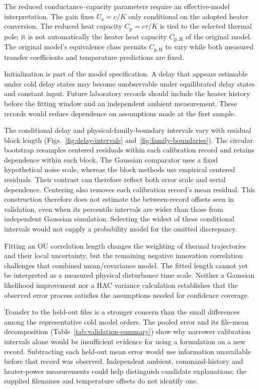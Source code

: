 \documentclass[11pt]{article}
\newcommand{\Ua}{U_{\mathrm a}}
\newcommand{\Cp}{C_{\mathrm p}}
\newcommand{\CpH}{C_{\mathrm{p,H}}}
\begin{document}
The reduced conductance--capacity parameters require an effective-model
interpretation. The gain fixes $\Ua=c/K$ only conditional on the adopted heater
conversion. The reduced heat capacity $\Cp=c\tau/K$ is tied to the selected
thermal pole; it is not automatically the heater heat capacity $\CpH$ of the
original model. The original model's equivalence class permits $\CpH$ to vary
while both measured transfer coefficients and temperature predictions are fixed.

Initialization is part of the model specification. A delay that appears estimable
under cold delay states may become unobservable under equilibrated delay states
and constant input. Future laboratory records should include the heater history
before the fitting window and an independent ambient measurement. These records
would reduce dependence on assumptions made at the first sample.

The conditional delay and physical-family-boundary intervals vary with residual
block length (Figs.~\ref{fig:delay-intervals} and~\ref{fig:family-boundaries}).
The circular bootstrap resamples centered residuals within each calibration
record and retains dependence within each block. The Gaussian comparator uses
a fixed hypothetical noise scale, whereas the block methods use empirical
centered residuals. Their contrast can therefore reflect both error scale and
serial dependence. Centering also
removes each calibration record's mean residual. This construction therefore
does not estimate the between-record offsets seen in validation, even when its
percentile intervals are wider than those from independent Gaussian simulation.
Selecting the widest of these conditional intervals would not supply a
probability model for the omitted discrepancy.

Fitting an OU correlation length
changes the weighting of thermal trajectories and their local uncertainty, but
the remaining negative innovation correlation challenges that combined
mean/covariance model. The fitted length cannot yet be interpreted as a measured
physical disturbance time scale. Neither a Gaussian likelihood improvement nor
a HAC variance calculation establishes that the observed error process satisfies
the assumptions needed for confidence coverage.

Transfer to the held-out files is a stronger concern than the small differences
among the representative cold model orders. The pooled error and its file-mean
decomposition (Table~\ref{tab:validation-summary}) show why narrower calibration
intervals alone would be insufficient evidence for using a formulation on a new
record. Subtracting each held-out mean error would use information unavailable
before that record was observed. Independent ambient, command-history and
heater-power measurements could help distinguish candidate explanations;
the supplied filenames and temperature offsets do not identify one.
\end{document}
